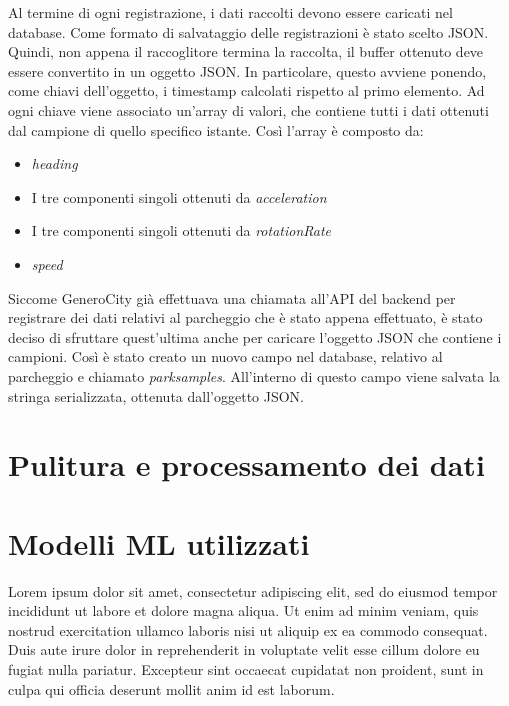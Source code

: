 Al termine di ogni registrazione, i dati raccolti devono essere caricati nel database.
Come formato di salvataggio delle registrazioni è stato scelto JSON. Quindi, non appena
il raccoglitore termina la raccolta, il buffer ottenuto deve essere convertito in un 
oggetto JSON. In particolare, questo avviene ponendo, come chiavi dell'oggetto, i timestamp
calcolati rispetto al primo elemento. Ad ogni chiave viene associato un'array di valori, che
contiene tutti i dati ottenuti dal campione di quello specifico istante. Così l'array è
composto da:
\begin{itemize}
    \item \emph{heading}
    \item I tre componenti singoli ottenuti da \emph{acceleration}
    \item I tre componenti singoli ottenuti da \emph{rotationRate}
    \item \emph{speed}
\end{itemize}
Siccome GeneroCity già effettuava una chiamata all'API del backend per registrare dei dati
relativi al parcheggio che è stato appena effettuato, è stato deciso di sfruttare quest'ultima
anche per caricare l'oggetto JSON che contiene i campioni. Così è stato creato un nuovo campo
nel database, relativo al parcheggio e chiamato \emph{parksamples}. All'interno di questo campo
viene salvata la stringa serializzata, ottenuta dall'oggetto JSON.

\section{Pulitura e processamento dei dati} 



\section{Modelli ML utilizzati} Lorem ipsum dolor sit amet, consectetur adipiscing elit, sed do eiusmod tempor incididunt ut labore et dolore magna aliqua. Ut enim ad minim veniam, quis nostrud exercitation ullamco laboris nisi ut aliquip ex ea commodo consequat. Duis aute irure dolor in reprehenderit in voluptate velit esse cillum dolore eu fugiat nulla pariatur. Excepteur sint occaecat cupidatat non proident, sunt in culpa qui officia deserunt mollit anim id est laborum.


